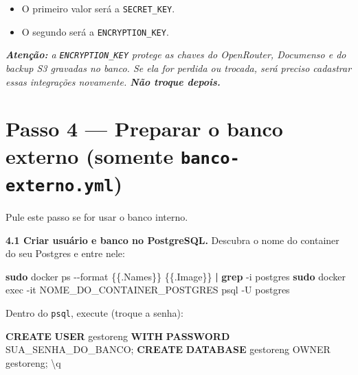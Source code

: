 \documentclass[
  10pt,
]{article}
\newenvironment{Shaded}{\begin{snugshade}}{\end{snugshade}}
\newcommand{\AttributeTok}[1]{\textcolor[rgb]{0.13,0.29,0.53}{#1}}
\newcommand{\FunctionTok}[1]{\textcolor[rgb]{0.13,0.29,0.53}{\textbf{#1}}}
\newcommand{\KeywordTok}[1]{\textcolor[rgb]{0.13,0.29,0.53}{\textbf{#1}}}
\newcommand{\NormalTok}[1]{#1}
\newcommand{\StringTok}[1]{\textcolor[rgb]{0.31,0.60,0.02}{#1}}
\providecommand{\tightlist}{%
  \setlength{\itemsep}{0pt}\setlength{\parskip}{0pt}}
\renewenvironment{quote}{\begin{oldquote}\small\itshape}{\end{oldquote}}
\begin{document}
\begin{itemize}
\tightlist
\item
  O primeiro valor será a \texttt{SECRET\_KEY}.
\item
  O segundo será a \texttt{ENCRYPTION\_KEY}.
\end{itemize}

\begin{quote}
\textbf{Atenção:} a \texttt{ENCRYPTION\_KEY} protege as chaves do
OpenRouter, Documenso e do backup S3 gravadas no banco. Se ela for
perdida ou trocada, será preciso cadastrar essas integrações novamente.
\textbf{Não troque depois.}
\end{quote}

\hypertarget{passo-4-preparar-o-banco-externo-somente-banco-externo.yml}{%
\section{\texorpdfstring{Passo 4 --- Preparar o banco externo (somente
\texttt{banco-externo.yml})}{Passo 4 --- Preparar o banco externo (somente banco-externo.yml)}}\label{passo-4-preparar-o-banco-externo-somente-banco-externo.yml}}

Pule este passo se for usar o banco interno.

\textbf{4.1 Criar usuário e banco no PostgreSQL.} Descubra o nome do
container do seu Postgres e entre nele:

\begin{Shaded}
\begin{Highlighting}[]
\FunctionTok{sudo}\NormalTok{ docker ps }\AttributeTok{{-}{-}format} \StringTok{\textquotesingle{}\{\{.Names\}\}  \{\{.Image\}\}\textquotesingle{}} \KeywordTok{|} \FunctionTok{grep} \AttributeTok{{-}i}\NormalTok{ postgres}
\FunctionTok{sudo}\NormalTok{ docker exec }\AttributeTok{{-}it}\NormalTok{ NOME\_DO\_CONTAINER\_POSTGRES psql }\AttributeTok{{-}U}\NormalTok{ postgres}
\end{Highlighting}
\end{Shaded}

Dentro do \texttt{psql}, execute (troque a senha):

\begin{Shaded}
\begin{Highlighting}[]
\KeywordTok{CREATE} \FunctionTok{USER}\NormalTok{ gestoreng }\KeywordTok{WITH} \KeywordTok{PASSWORD} \StringTok{\textquotesingle{}SUA\_SENHA\_DO\_BANCO\textquotesingle{}}\NormalTok{;}
\KeywordTok{CREATE} \KeywordTok{DATABASE}\NormalTok{ gestoreng OWNER gestoreng;}
\NormalTok{\textbackslash{}q}
\end{Highlighting}
\end{Shaded}
\end{document}
